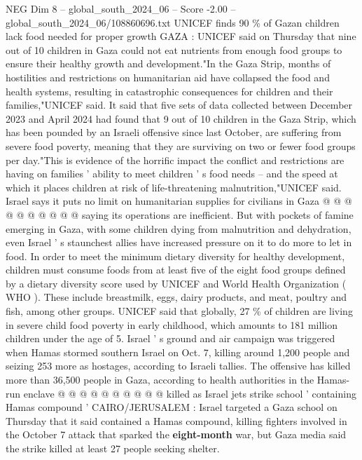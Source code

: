 \begin{textsample}{NEG Dim 8 – global\_south\_2024\_06 – Score -2.00 – global\_south\_2024\_06/108860696.txt}  \label{ex:f8_neg_039}
UNICEF finds 90 \% of Gazan children lack food needed for proper growth GAZA : UNICEF said on Thursday that nine out of 10 children in Gaza could not eat nutrients from enough food groups to ensure their healthy growth and development."In the Gaza Strip, months of hostilities and restrictions on humanitarian aid have collapsed the food and health systems, resulting in catastrophic consequences for children and their families,"UNICEF said.
It said that five sets of data collected between December 2023 and April 2024 had found that 9 out of 10 children in the Gaza Strip, which has been pounded by an Israeli offensive since last October, are suffering from severe food poverty, meaning that they are surviving on two or fewer food groups per day."This is evidence of the horrific impact the conflict and restrictions are having on families ' ability to meet children ' s food needs -- and the speed at which it places children at risk of life-threatening malnutrition,"UNICEF said.
Israel says it puts no limit on humanitarian supplies for civilians in Gaza @ @ @ @ @ @ @ @ @ @ saying its operations are inefficient.
But with pockets of famine emerging in Gaza, with some children dying from malnutrition and dehydration, even Israel ' s staunchest allies have increased pressure on it to do more to let in food.
In order to meet the minimum dietary diversity for healthy development, children must consume foods from at least five of the eight food groups defined by a dietary diversity score used by UNICEF and World Health Organization ( WHO ).
These include breastmilk, eggs, dairy products, and meat, poultry and fish, among other groups.
UNICEF said that globally, 27 \% of children are living in severe child food poverty in early childhood, which amounts to 181 million children under the age of 5.
Israel ' s ground and air campaign was triggered when Hamas stormed southern Israel on Oct. 7, killing around 1,200 people and seizing 253 more as hostages, according to Israeli tallies.
The offensive has killed more than 36,500 people in Gaza, according to health authorities in the Hamas-run enclave @ @ @ @ @ @ @ @ @ @ killed as Israel jets strike school ' containing Hamas compound ' CAIRO/JERUSALEM : Israel targeted a Gaza school on Thursday that it said contained a Hamas compound, killing fighters involved in the October 7 attack that sparked the \textbf{eight-month} war, but Gaza media said the strike killed at least 27 people seeking shelter.

\end{textsample}

